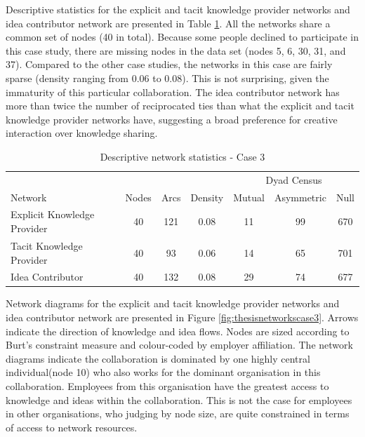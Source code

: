 Descriptive statistics for the explicit and tacit knowledge provider networks and idea contributor network are presented in Table \ref{ds_c3}. All the networks share a common set of nodes (40 in total). Because some people declined to participate in this case study, there are missing nodes in the data set (nodes 5, 6, 30, 31, and 37). Compared to the other case studies, the networks in this case are fairly sparse (density ranging from 0.06 to 0.08). This is not surprising, given the immaturity of this particular collaboration. The idea contributor network has more than twice the number of reciprocated ties than what the explicit and tacit knowledge provider networks have, suggesting a broad preference for creative interaction over knowledge sharing.\medskip

\begin{table}[]
	\small
	\centering
	\caption{Descriptive network statistics - Case 3}
	\label{ds_c3}
	\begin{tabular}{@{}lcccccc@{}}
		\toprule
		& \multicolumn{1}{l}{} & \multicolumn{1}{l}{} & \multicolumn{1}{l}{} & \multicolumn{3}{c}{Dyad Census}	\\ \cline{5-7}
		Network						& Nodes			& Arcs			& Density	& Mutual		& Asymmetric	& Null		\\ \midrule
		Explicit Knowledge Provider & 40			& 121			& 0.08		& 11			& 99			& 670		\\
		Tacit Knowledge Provider    & 40			& 93			& 0.06		& 14			& 65			& 701		\\
		Idea Contributor            & 40			& 132			& 0.08		& 29			& 74			& 677		\\ \bottomrule
	\end{tabular}
\end{table}

Network diagrams for the explicit and tacit knowledge provider networks and idea contributor network are presented in Figure \ref{fig:thesisnetworkscase3}. Arrows indicate the direction of knowledge and idea flows. Nodes are sized according to Burt's constraint measure and colour-coded by employer affiliation. The network diagrams indicate the collaboration is dominated by one highly central individual(node 10) who also works for the dominant organisation in this collaboration. Employees from this organisation have the greatest access to knowledge and ideas within the collaboration. This is not the case for employees in other organisations, who judging by node size, are quite constrained in terms of access to network resources.\medskip

